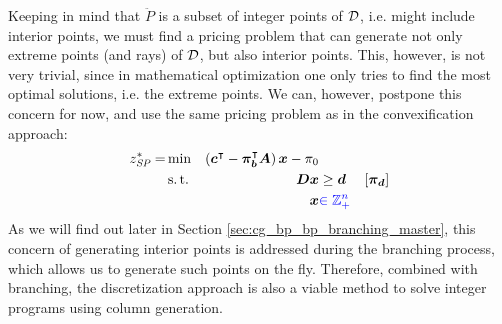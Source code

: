 Keeping in mind that $\ddot{P}$ is a subset of integer points of $\mathcal{D}$, i.e. might include interior points, we must find a pricing problem that can generate not only extreme points (and rays) of $\mathcal{D}$, but also interior points. This, however, is not very trivial, since in mathematical optimization one only tries to find the most optimal solutions, i.e. the extreme points. We can, however, postpone this concern for now, and use the same pricing problem as in the convexification approach:
\begin{equation}
\begin{aligned}
z^*_\SP{} = &\min & \left( \vec{c}\transpose - \vec{\pi}_\vec{b}\transpose \mat{A} \right) \vec{x} - \pi_0 & & \\
&\st & \mat{D} \vec{x} & \geq \vec{d} & \left[\vec{\pi}_\vec{d}\right] \\
&& \vec{x} & {\color{blue} \in \mathbb{Z}_+^n}
\end{aligned}
\end{equation}
As we will find out later in Section \ref{sec:cg_bp_bp_branching_master}, this concern of generating interior points is addressed during the branching process, which allows us to generate such points on the fly. Therefore, combined with branching, the discretization approach is also a viable method to solve integer programs using column generation.
